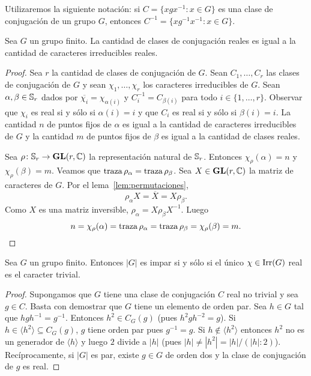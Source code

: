 Utilizaremos la siguiente notación: si $C=\{xgx^{-1}:x\in G\}$ es una clase de
conjugación de un grupo $G$, entonces $C^{-1}=\{xg^{-1}x^{-1}:x\in G\}$.  

\begin{theorem}[Burnside]
  Sea $G$ un grupo finito. La cantidad de clases de conjugación reales es igual
  a la cantidad de caracteres irreducibles reales.
\end{theorem}

\begin{proof}
  Sea $r$ la cantidad de clases de conjugación de $G$. Sean $C_1,\dots,C_r$ las
  clases de conjugación de $G$ y sean $\chi_1,\dots,\chi_r$ los caracteres
  irreducibles de $G$. 
  Sean $\alpha,\beta\in\mathbb{S}_r$ dados por $\overline{\chi_i}=\chi_{\alpha(i)}$ y
  $C_i^{-1}=C_{\beta(i)}$ para todo $i\in\{1,\dots,r\}$. Observar que $\chi_i$
  es real si y sólo si $\alpha(i)=i$ y que $C_i$ es real si y sólo si
  $\beta(i)=i$. La cantidad $n$ de puntos fijos de $\alpha$ es igual a la cantidad
  de caracteres irreducibles de $G$ y la cantidad $m$ de puntos fijos de $\beta$ es
  igual a la cantidad de clases reales. 

  Sea $\rho\colon\mathbb{S}_r\to\mathbf{GL}(r,\mathbb{C})$ la representación natural de $\mathbb{S}_r$. Entonces
  $\chi_\rho(\alpha)=n$ y $\chi_\rho(\beta)=m$. Veamos que 
  $\operatorname{traza}\rho_\alpha=\operatorname{traza}\rho_\beta$. 
  Sea $X\in\mathbf{GL}(r,\mathbb{C})$ la matriz de caracteres de $G$. Por el lema~\ref{lem:permutaciones}, 
  \[
	\rho_\alpha X=\overline{X}=X\rho_\beta.
  \]
  Como $X$ es una matriz inversible, $\rho_{\alpha}=X\rho_{\beta}X^{-1}$. Luego
  \[
    n=\chi_{\rho}(\alpha)=\operatorname{traza}\rho_{\alpha}=\operatorname{traza}\rho_{\beta}=\chi_{\rho}(\beta)=m.\qedhere
  \]
\end{proof}

\begin{corollary}
  \label{corollary:|G|impar}
  Sea $G$ un grupo finito. Entonces $|G|$ es impar si y sólo si el único
  $\chi\in\operatorname{Irr}(G)$ real es el caracter trivial. 
\end{corollary}


\begin{proof}
  Supongamos que $G$ tiene una clase de conjugación $C$ real no trivial y sea
  $g\in C$. Basta con demostrar que $G$ tiene un elemento de orden par.  Sea
  $h\in G$ tal que $hgh^{-1}=g^{-1}$. Entonces $h^2\in C_G(g)$ (pues
  $h^2gh^{-2}=g$). Si $h\in\langle h^2\rangle\subseteq C_G(g)$, $g$ tiene orden
  par pues $g^{-1}=g$. Si $h\not\in\langle h^2\rangle$ entonces $h^2$ no es un
  generador de $\langle h\rangle$ y luego $2$ divide a $|h|$ (pues
  $|h|\ne|h^2|=|h|/(|h|:2)$).  Recíprocamente, si $|G|$ es par, existe $g\in G$
  de orden dos y la clase de conjugación de $g$ es real. 
\end{proof}

